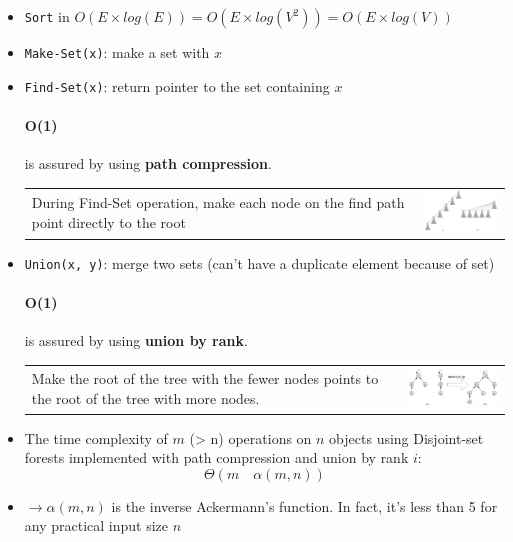 \begin{itemize}
    \item \texttt{Sort} in $O(E \times log(E)) = O(E \times log(V^2)) = O(E \times log(V))$
    \item \texttt{Make-Set(x)}: make a set with $x$
    \item \texttt{Find-Set(x)}: return pointer to the set containing $x$

        \paragraph{O(1)} is assured by using \textbf{path compression}.

        \begin{tabular}{m{11cm}m{3cm}}
            During Find-Set operation, make each node
            on the find path point directly to the root
            &
            \includegraphics[width=3cm]{img/compression}
    \end{tabular}


    \item \texttt{Union(x, y)}: merge two sets (can't have a duplicate element
        because of set)

        \paragraph{O(1)} is assured by using \textbf{union by rank}.

        \begin{tabular}{m{11cm}m{3cm}}
            Make the root of the tree with the fewer nodes points to
            the root of the tree with more nodes.
            &
            \includegraphics[width=4cm]{img/union}
    \end{tabular}
\end{itemize}

\begin{itemize}
    \item The time complexity of $m$ (> n) operations on $n$ objects
        using Disjoint-set forests implemented with path
        compression and union by rank $i$: 
        $$\Theta(m \quad \alpha(m,n))$$
    \item $\rightarrow \alpha(m, n)$ is the inverse Ackermann's function. 
        In fact, it's less than 5 for any practical input size $n$
\end{itemize}

